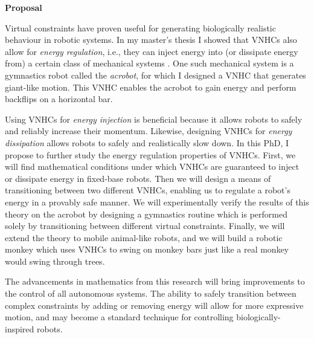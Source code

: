 \documentclass[a4paper,12pt]{article}
\begin{document}
\newpage

\begin{large} \textbf{Proposal} \end{large}

Virtual constraints have proven useful for generating biologically realistic
behaviour in robotic systems.
In my master's thesis I showed that VNHCs also allow for 
\textit{energy regulation}, i.e., they can inject energy into (or dissipate
energy from) a certain class of mechanical systems \cite{my-thesis}.
One such mechanical system is a gymnastics robot called the
\textit{acrobot}, for which I designed a VNHC that generates giant-like motion. 
This VNHC enables the acrobot to gain energy and perform backflips on a
horizontal bar.

Using VNHCs for \textit{energy injection} is beneficial because it allows robots to
safely and reliably increase their momentum.
Likewise, designing VNHCs for \textit{energy dissipation} allows robots to
safely and realistically slow down.
In this PhD, I propose to further study the energy regulation properties of VNHCs.
First, we will find mathematical conditions under which VNHCs are guaranteed to
inject or dissipate energy in fixed-base robots.
Then we will design a means of transitioning between two different VNHCs,
enabling us to regulate a robot's energy in a provably safe manner.
We will experimentally verify the results of this theory on the acrobot by
designing a gymnastics routine which is performed solely by transitioning
between different virtual constraints.
Finally, we will extend the theory to mobile animal-like robots,
and we will build a robotic monkey which uses VNHCs to swing on monkey bars just
like a real monkey would swing through trees.

The advancements in mathematics from this research will bring improvements
to the control of all autonomous systems. 
The ability to safely transition between complex constraints by adding or
removing energy will allow for more expressive motion, and may become a standard
technique for controlling biologically-inspired robots.

\newpage
\printbibliography
\end{document}
